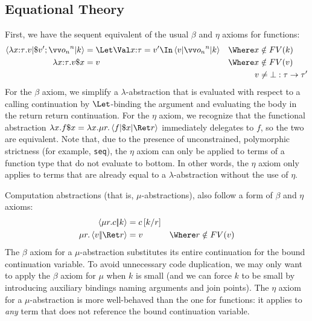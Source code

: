 \documentclass{article}
\begin{document}
\subsection{Equational Theory}

First, we have the sequent equivalent of the usual $\beta$ and $\eta$ axioms for
functions:
\begin{align*}
  \braket{\fn{\ann{x}{\ty}} \tm | \appto{\tm'} \then \vect[n]{\frm_n} | \ko}
  &=
  \Let \nonrec{\bindv{\ann{x}{\ty}}{\tm'}} \In \braket{\tm | \vect[n]{\frm_n} | \ko}
  &
  \Where
  x &\notin FV(\ko)
  \\
  \fn{\ann{x}{\ty}} \tm \appto{x}
  &=
  \tm
  &
  \Where
  x &\notin FV(\tm)
  \\
  &&
  \tm &\neq \bot : \ty \to \ty'
\end{align*}
For the $\beta$ axiom, we simplify a $\lambda$-abstraction that is evaluated
with respect to a calling continuation by $\Let$-binding the argument and
evaluating the body in the return return continuation.  For the $\eta$ axiom, we
recognize that the functional abstraction
$\fn{x}f\appto{x}=\fn{x}\comp{r}\braket{f | \appto{x} | \ret r}$ immediately
delegates to $f$, so the two are equivalent.  Note that, due to the presence of
unconstrained, polymorphic strictness (for example, \texttt{seq}), the $\eta$
axiom can only be applied to terms of a function type that do not evaluate to
bottom.  In other words, the $\eta$ axiom only applies to terms that are already
equal to a $\lambda$-abstraction without the use of $\eta$.

Computation abstractions (that is, $\mu$-abstractions), also follow a form of
$\beta$ and $\eta$ axioms:
\begin{align*}
  \cut{\comp{r}\cmd}{\ko}
  &=
  \cmd\subst{r}{\ko}
  \\
  \comp{r}\cut{\tm}{\ret r}
  &=
  \tm
  &
  \Where
  r \notin FV(\tm)
\end{align*}
The $\beta$ axiom for a $\mu$-abstraction substitutes its entire continuation
for the bound continuation variable.  To avoid unnecessary code duplication, we
may only want to apply the $\beta$ axiom for $\mu$ when $k$ is small (and we can
force $k$ to be small by introducing auxiliary bindings naming arguments and
join points).  The $\eta$ axiom for a $\mu$-abstraction is more well-behaved
than the one for functions: it applies to \emph{any} term that does not
reference the bound continuation variable.
\end{document}
